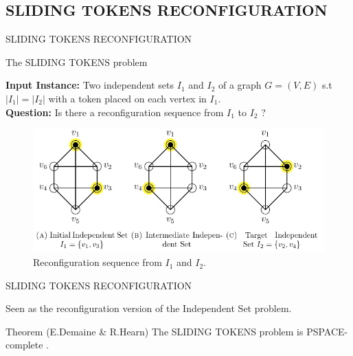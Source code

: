 \subsection{SLIDING TOKENS RECONFIGURATION}

\begin{frame}{SLIDING TOKENS RECONFIGURATION}
\begin{block}{The SLIDING TOKENS problem} 
    \begin{flushleft}
      \textbf{Input Instance: } Two independent sets $I_1$ and $I_2$ of a graph $G = (V,E)$ s.t $|I_1| = |I_2|$ with a token placed on each vertex in $I_1$. \\
      \hfill \break
      \textbf{Question: } Is there a reconfiguration sequence from $I_1$ to $I_2$ ?\\
    \end{flushleft}
   \end{block}
   
   \begin{figure}
        \centering
        \includegraphics[scale=0.3]{img/sliding.png}
        \caption{Reconﬁguration sequence from $I_1$ and $I_2$.}
        \label{fig:ps}
    \end{figure}
\end{frame}

\begin{frame}{SLIDING TOKENS RECONFIGURATION}
    
    Seen as the reconfiguration version of the Independent Set problem.
    
    \begin{block}{Theorem (E.Demaine \& R.Hearn)} The SLIDING TOKENS problem is PSPACE-complete \cite{hearn_demaine_ncl_book}. 
   \end{block}
\end{frame}

